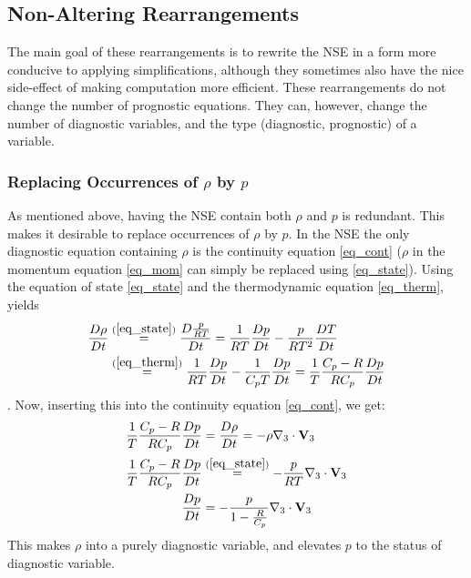 \subsection{Non-Altering Rearrangements}
The main goal of these rearrangements is to rewrite the NSE in a form more conducive to applying simplifications, although they sometimes also have the nice side-effect of making computation more efficient.
These rearrangements do not change the number of prognostic equations.
They can, however, change the number of diagnostic variables, and the type (diagnostic, prognostic) of a variable.
\subsubsection{Replacing Occurrences of $\rho$ by $p$}\label{subsec_rho_p}
As mentioned above, having the NSE contain both $\rho$ and $p$ is redundant.
This makes it desirable to replace occurrences of $\rho$ by $p$.
In the NSE the only diagnostic equation containing $\rho$ is the continuity equation \ref{eq_cont} ($\rho$ in the momentum equation \ref{eq_mom} can simply be replaced using \ref{eq_state}).
Using the equation of state \ref{eq_state} and the thermodynamic equation \ref{eq_therm}, yields
\begin{align*}
\frac{D\rho}{Dt} &\stackrel{(\ref{eq_state})}{=} \frac{D\frac{p}{RT}}{Dt} = \frac{1}{RT}\frac{Dp}{Dt}-\frac{p}{RT^2}\frac{DT}{Dt}\\
&\stackrel{(\ref{eq_therm})}{=} \frac{1}{RT}\frac{Dp}{Dt}-\frac{1}{C_pT}\frac{Dp}{Dt} = \frac{1}{T}\frac{C_p-R}{RC_p}\frac{Dp}{Dt}
\end{align*}.
Now, inserting this into the continuity equation \ref{eq_cont}, we get:
\begin{align*}
\frac{1}{T}\frac{C_p-R}{RC_p}\frac{Dp}{Dt} &= \frac{D\rho}{Dt} = -\rho \nabla _3 \cdot \textbf{V}_3\\
\frac{1}{T}\frac{C_p-R}{RC_p}\frac{Dp}{Dt} &\stackrel{(\ref{eq_state})}{=} -\frac{p}{RT} \nabla _3 \cdot \textbf{V}_3\\
\frac{Dp}{Dt} &= - \frac{p}{1-\frac{R}{C_p}} \nabla _3 \cdot \textbf{V}_3
\end{align*}
This makes $\rho$ into a purely diagnostic variable, and elevates $p$ to the status of diagnostic variable.


